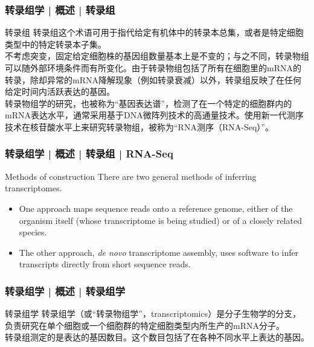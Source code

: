 \begin{frame}
  \frametitle{转录组学 | 概述 | 转录组}
  \begin{block}{转录组}
转录组这个术语可用于指代给定有机体中的转录本总集，或者是特定细胞类型中的特定转录本子集。\\
\vspace{0.5em}
不考虑突变，固定给定细胞株的基因组数量基本上是不变的；与之不同，转录物组可以随外部环境条件而有所变化。由于转录物组包括了所有在细胞里的mRNA的转录，除却异常的mRNA降解现象（例如转录衰减）以外，转录组反映了在任何给定时间内活跃表达的基因。\\
\vspace{0.5em}
转录物组学的研究，也被称为“基因表达谱”，检测了在一个特定的细胞群内的mRNA表达水平，通常采用基于DNA微阵列技术的高通量技术。使用新一代测序技术在核苷酸水平上来研究转录物组，被称为“RNA测序（RNA-Seq）”。
  \end{block}
\end{frame}

\begin{frame}
  \frametitle{转录组学 | 概述 | 转录组 | RNA-Seq}
  \begin{block}{Methods of construction}
    There are two general methods of inferring transcriptomes.
    \begin{itemize}
      \item One approach maps sequence reads onto a reference genome, either of the organism itself (whose transcriptome is being studied) or of a closely related species.
      \item The other approach, \textit{de novo} transcriptome assembly, uses software to infer transcripts directly from short sequence reads.
    \end{itemize}
  \end{block}
\end{frame}

\begin{frame}
  \frametitle{转录组学 | 概述 | 转录组学}
  \begin{block}{转录组学}
转录组学（或“转录物组学”，transcriptomics）是分子生物学的分支，负责研究在单个细胞或一个细胞群的特定细胞类型内所生产的mRNA分子。\\
    \vspace{0.5em}
转录组测定的是表达的基因数目。这个数目包括了在各种不同水平上表达的基因。\\
\end{block}
\end{frame}

